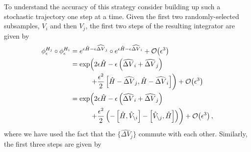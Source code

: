 \documentclass{article}
\begin{document}
To understand the accuracy of this strategy consider building up such a 
stochastic trajectory one step at a time.  Given the first two randomly-selected 
subsamples, $V_{i}$ and then $V_{j}$, the first two steps of the resulting
integrator are given by
%
\begin{align*}
\phi^{H_{j}}_{\epsilon} \circ \phi^{H_{i}}_{\epsilon}
&=
e^{ \epsilon \hat{H} - \epsilon  \widehat{ \Delta V}_{j} } 
\circ e^{ \epsilon \hat{H} - \epsilon  \widehat{ \Delta V}_{i} }
+ \mathcal{O} \! \left( \epsilon^{3} \right)
\\
&=
\exp \! \left( 
2 \epsilon \hat{H} - \epsilon \left(  \widehat{ \Delta V}_{i} +  \widehat{ \Delta V}_{j} \right)
\right.
\\
& \hspace{10mm} \left.
+ \frac{\epsilon^{2}}{2} \left[ \hat{H} -  \widehat{ \Delta V}_{j}, \hat{H} - \widehat{ \Delta V}_{i} \right]
\right)
+ \mathcal{O} \! \left( \epsilon^{3} \right)
\\
&=
\exp \! \left( 
2 \epsilon \hat{H} - \epsilon \left( \widehat{ \Delta V}_{i} + \widehat{ \Delta V}_{j} \right)
\right.
\\
& \hspace{10mm} \left.
+ \frac{\epsilon^{2}}{2} \left(
- \left[ \hat{H}, \hat{V}_{\setminus i} \right]
- \left[ \hat{V}_{\setminus j}, \hat{H} \right] \right) \right)
+ \mathcal{O} \! \left( \epsilon^{3} \right),
\end{align*}
%
where we have used the fact that the $\{ \widehat{ \Delta V}_{j} \}$ commute
with each other.  Similarly, the first three steps are given by
%
\end{document}
